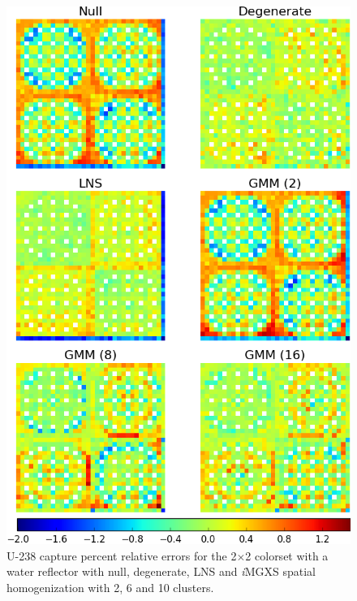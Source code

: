 \begin{figure}[h!]
\centering
\includegraphics[width=0.9\linewidth]{figures/results/spatial/reflector/capt-err}
\vspace{2mm}
\caption[U-238 capture errors for the 2$\times$2 colorset with reflector]{U-238 capture percent relative errors for the 2$\times$2 colorset with a water reflector with null, degenerate, \ac{LNS} and \textit{i}\ac{MGXS} spatial homogenization with 2, 6 and 10 clusters.}
\label{fig:chap11-refl-capt-err}
\end{figure}

\clearpage

